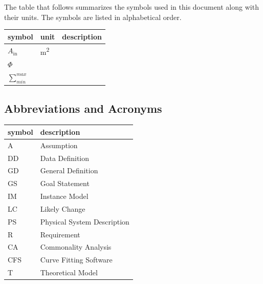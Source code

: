 \documentclass[12pt]{article}
\newcommand{\famname}{CFS} %
\begin{document}
The table that follows summarizes the symbols used in this document along with
their units. The symbols are listed in alphabetical order.
\renewcommand{\arraystretch}{1.2}
\noindent \begin{longtable*}{l l p{12cm}} \toprule
\textbf{symbol} & \textbf{unit} & \textbf{description}\\
\midrule 

$A_\text{in}$ & \si[per-mode=symbol] {\square\metre} & \\
$\Phi$ & & \\
$\sum_{min}^{max}$& & \\
 
\bottomrule
\end{longtable*}

\subsection{Abbreviations and Acronyms}

\renewcommand{\arraystretch}{1.2}
\begin{tabular}{l l} 
  \toprule		
  \textbf{symbol} & \textbf{description}\\
  \midrule 
  A & Assumption\\
  DD & Data Definition\\
  GD & General Definition\\
  GS & Goal Statement\\
  IM & Instance Model\\
  LC & Likely Change\\
  PS & Physical System Description\\
  R & Requirement\\
  CA & Commonality Analysis\\
  \famname & Curve Fitting Software\\
  T & Theoretical Model\\
  \bottomrule
\end{tabular}\\

\end{document}

